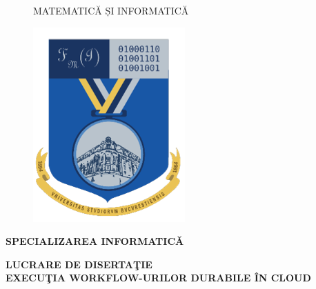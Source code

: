 \begin{titlepage}
\begin{center}
\begin{figure}[htbp]
\begin{minipage}{0.5\textwidth}
\begin{large}
\begin{center}
{                    MATEMATICĂ ȘI INFORMATICĂ}
								\end{center}
                \end{large}
            \end{minipage}
            \begin{minipage}{0.2\textwidth}
              \includegraphics[width=\linewidth]{images/poza_dreapta.png}
            \end{minipage}
        \end{figure}
        
        \vspace*{1cm}
        
        \begin{large}
            \textbf{SPECIALIZAREA INFORMATICĂ}
        \end{large}

        \vspace{2.5cm}
        \begin{LARGE}
            \textbf{LUCRARE DE DISERTAŢIE}\\
            \vspace*{0.5cm}
            \textbf{EXECUŢIA WORKFLOW-URILOR DURABILE ÎN CLOUD}
        \end{LARGE}
            

\end{center}
\end{titlepage}
